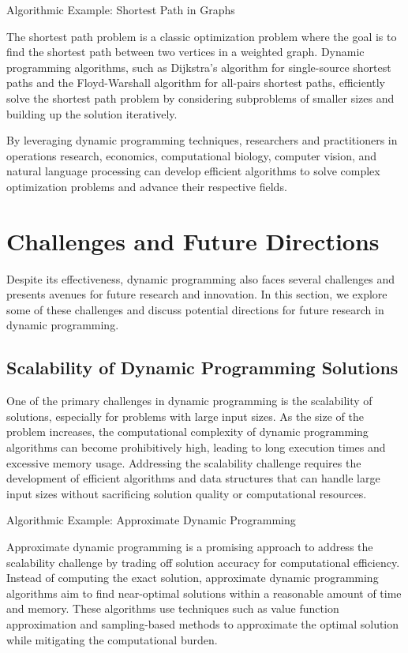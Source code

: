 \documentclass[12pt]{book} %
\begin{document}
Algorithmic Example: Shortest Path in Graphs

The shortest path problem is a classic optimization problem where the goal is to find the shortest path between two vertices in a weighted graph. Dynamic programming algorithms, such as Dijkstra's algorithm for single-source shortest paths and the Floyd-Warshall algorithm for all-pairs shortest paths, efficiently solve the shortest path problem by considering subproblems of smaller sizes and building up the solution iteratively.

By leveraging dynamic programming techniques, researchers and practitioners in operations research, economics, computational biology, computer vision, and natural language processing can develop efficient algorithms to solve complex optimization problems and advance their respective fields.


\section{Challenges and Future Directions}

Despite its effectiveness, dynamic programming also faces several challenges and presents avenues for future research and innovation. In this section, we explore some of these challenges and discuss potential directions for future research in dynamic programming.

\subsection{Scalability of Dynamic Programming Solutions}

One of the primary challenges in dynamic programming is the scalability of solutions, especially for problems with large input sizes. As the size of the problem increases, the computational complexity of dynamic programming algorithms can become prohibitively high, leading to long execution times and excessive memory usage. Addressing the scalability challenge requires the development of efficient algorithms and data structures that can handle large input sizes without sacrificing solution quality or computational resources.

Algorithmic Example: Approximate Dynamic Programming

Approximate dynamic programming is a promising approach to address the scalability challenge by trading off solution accuracy for computational efficiency. Instead of computing the exact solution, approximate dynamic programming algorithms aim to find near-optimal solutions within a reasonable amount of time and memory. These algorithms use techniques such as value function approximation and sampling-based methods to approximate the optimal solution while mitigating the computational burden.
\end{document}

